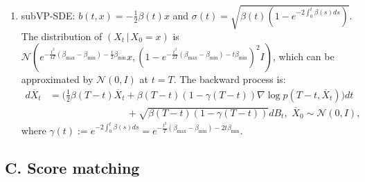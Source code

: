 \documentclass[letterpaper,10pt,reqno]{amsart}
\numberwithin{equation}{section}
\begin{document}
\begin{enumerate}[itemsep = 3 pt]
\begin{equation}
\begin{aligned}
\end{aligned}
\end{equation}
\item[(d)]
subVP-SDE: 
$b(t,x) = -\frac{1}{2} \beta(t)x$ and $\sigma(t) = \sqrt{\beta(t) (1 - e^{-2 \int_0^t \beta(s) ds})}$.
The distribution of $(X_t \,|\, X_0 = x)$ is
$\mathcal{N}( e^{-\frac{t^2}{4T}(\beta_{\max} - \beta_{\min}) - \frac{t}{2} \beta_{\min}}  x,  
(1 -e^{-\frac{t^2}{2T}(\beta_{\max} - \beta_{\min}) - t \beta_{\min}} )^2 I )$,
which can be approximated by $\mathcal{N}(0,I)$ at $t = T$.
The backward process is:
\begin{equation}
\label{eq:SVPrev2}
\begin{aligned}
d\overline{X}_t & = \bigg( \frac{1}{2} \beta(T-t) \overline{X}_t  + \beta(T-t)(1 - \gamma(T-t)) \nabla \log p(T-t, \overline{X}_t)\bigg)  dt \\
& \qquad \qquad \qquad \qquad + \sqrt{\beta(T-t) (1 - \gamma(T-t))} dB_t,  \,\, \overline{X}_0 \sim \mathcal{N}(0, I),
\end{aligned}
\end{equation}
where $\gamma(t):= e^{-2 \int_0^t \beta(s) ds} = e^{-\frac{t^2}{T}(\beta_{\max} - \beta_{\min}) - 2t \beta_{\min}}$.
\end{enumerate}
\subsection*{C. Score matching}

\end{document}
